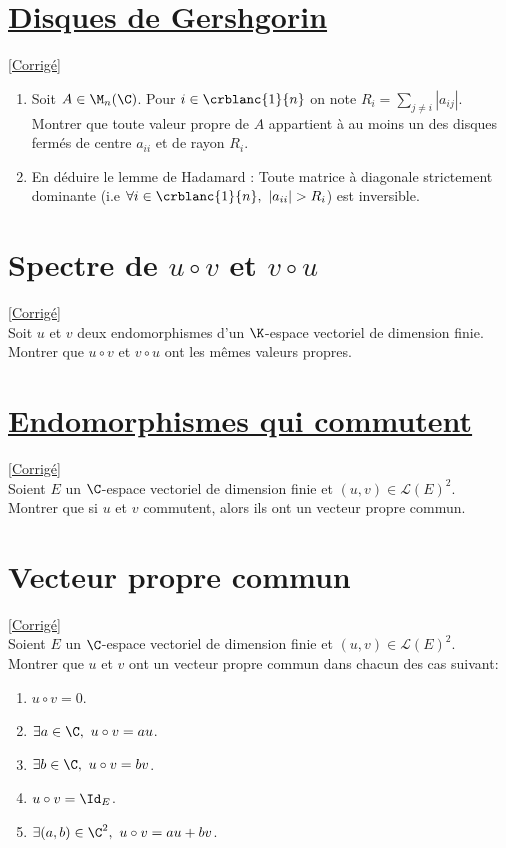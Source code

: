 \documentclass[8pt]{book}
\begin{document}
	\section{\underline{Disques de Gershgorin} }
	\label{Disques de Gershgorin}
	\textcolor{blue}{\hyperref[Disques de Gershgorin corrigé]{[Corrigé]}}\\
	\begin{enumerate}[leftmargin=*]
		\item Soit $A\in \M_n(\C)$. Pour $i\in \crblanc{1}{n}$ on note $R_i=\displaystyle\sum_{j\ne i}{|a_{ij}|}$.\\ Montrer que toute valeur propre de $A$ appartient à au moins un des disques fermés de centre $a_{ii}$ et de rayon $R_i$.
		\item En déduire le lemme de Hadamard :
		Toute matrice à diagonale strictement dominante (i.e $\forall i\in \crblanc{1}{n},\ |a_{ii}|>R_i$) est inversible.
	\end{enumerate}
	
	\section{Spectre de $u\circ v$ et $v\circ u$ }
	\label{Spectre de uov et vou}
	\textcolor{blue}{\hyperref[Spectre de uov et vou corrigé]{[Corrigé]}}\\
	Soit $u$ et $v$ deux endomorphismes d'un $\K$-espace vectoriel de dimension finie.
	Montrer que $u\circ v$ et $v\circ u$ ont les mêmes valeurs propres.
	
	\section{\underline{Endomorphismes qui commutent} }
	\label{Endomorphismes qui commutent}
	\textcolor{blue}{\hyperref[Endomorphismes qui commutent corrigé]{[Corrigé]}}\\
	Soient $E$ un $\C$-espace vectoriel de dimension finie et $(u,v)\in \mathcal{L}(E)^2$.\\
	Montrer que si $u$ et $v$ commutent, alors ils ont un vecteur propre commun.
	
	\section{Vecteur propre commun }
	\label{Vecteur propre commun}
	\textcolor{blue}{\hyperref[Vecteur propre commun corrigé]{[Corrigé]}}\\
	Soient $E$ un $\C$-espace vectoriel de dimension finie et $(u,v)\in \mathcal{L}(E)^2$.\\ Montrer que $u$ et $v$ ont un vecteur propre commun dans chacun des cas suivant:
	\begin{enumerate}[leftmargin=*]
		\item $u\circ v=0$.
		\item $\exists a\in \C,\ u\circ v=au$.
		\item $\exists b\in \C,\ u\circ v=bv$.
		\item $u\circ v=\Id_E$.
		\item $\exists (a,b)\in \C^2,\ u\circ v=au+bv$.
	\end{enumerate}
	
\end{document}
